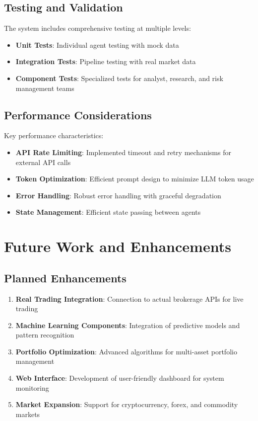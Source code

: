 \documentclass[11pt,a4paper]{article}
\begin{document}
\subsection{Testing and Validation}

The system includes comprehensive testing at multiple levels:

\begin{itemize}
    \item \textbf{Unit Tests}: Individual agent testing with mock data
    \item \textbf{Integration Tests}: Pipeline testing with real market data
    \item \textbf{Component Tests}: Specialized tests for analyst, research, and risk management teams
\end{itemize}

\subsection{Performance Considerations}

Key performance characteristics:

\begin{itemize}
    \item \textbf{API Rate Limiting}: Implemented timeout and retry mechanisms for external API calls
    \item \textbf{Token Optimization}: Efficient prompt design to minimize LLM token usage
    \item \textbf{Error Handling}: Robust error handling with graceful degradation
    \item \textbf{State Management}: Efficient state passing between agents
\end{itemize}

\section{Future Work and Enhancements}

\subsection{Planned Enhancements}

\begin{enumerate}
    \item \textbf{Real Trading Integration}: Connection to actual brokerage APIs for live trading
    \item \textbf{Machine Learning Components}: Integration of predictive models and pattern recognition
    \item \textbf{Portfolio Optimization}: Advanced algorithms for multi-asset portfolio management
    \item \textbf{Web Interface}: Development of user-friendly dashboard for system monitoring
    \item \textbf{Market Expansion}: Support for cryptocurrency, forex, and commodity markets
\end{enumerate}
\end{document}
